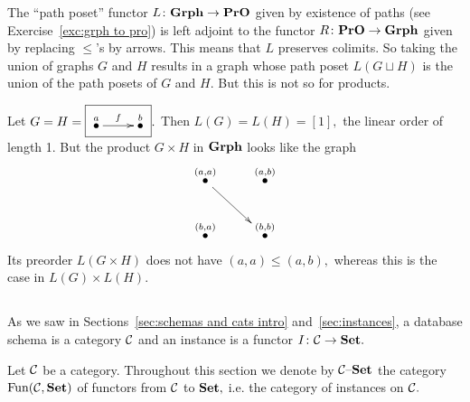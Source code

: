 \documentclass[../main/CT4S-EN-RU]{subfiles}
\begin{document}
\begin{exampleRUS}
\end{exampleRUS}

\begin{exampleENG}
The “path poset” functor $L\colon{\mathbf{Grph}}\rightarrow{\mathbf{PrO}}$ given by existence of paths (see Exercise~\ref{exc:grph to pro}) is left adjoint to the functor $R\colon{\mathbf{PrO}}\rightarrow{\mathbf{Grph}}$ given by replacing $\leq$'s by arrows. This means that $L$ preserves colimits. So taking the union of graphs $G$ and $H$ results in a graph whose path poset  $L(G\sqcup H)$ is the union of the path posets of $G$ and $H.$ But this is not so for products. 

Let $G=H=\fbox{\xymatrix{\LMO{a}\ar[r]^f&\LMO{b}}}.$ Then $L(G)=L(H)=[1],$ the linear order of length 1. But the product $G\times H$ in ${\mathbf{Grph}}$ looks like the graph 
$$\xymatrix{\LMO{(a,a)}\ar[rd]&\LMO{(a,b)}\\\LMO{(b,a)}&\LMO{(b,b)}}$$
Its preorder $L(G\times H)$ does not have $(a,a)\leq(a,b),$ whereas this is the case in $L(G)\times L(H).$
\end{exampleENG}

\begin{exampleRUS}
\end{exampleRUS}


\subsection{}\label{sec:data migration}

\begin{blockENG}
As we saw in Sections~\ref{sec:schemas and cats intro} and~\ref{sec:instances}, a database schema is a category $\mathcal{C}$ and an instance is a functor $I\colon\mathcal{C}\rightarrow{\mathbf{Set}}.$  
\end{blockENG}

\begin{blockRUS}
\end{blockRUS}

\begin{notationENG}
Let $\mathcal{C}$ be a category. Throughout this section we denote by $\mathcal{C}{\text \textendash}{\mathbf{Set}}$ the category $\operatorname{Fun}(\mathcal{C},{\mathbf{Set}})$ of functors from $\mathcal{C}$ to ${\mathbf{Set}},$ i.e. the category of instances on $\mathcal{C}.$ 
\end{notationENG}

\begin{notationRUS}
\end{notationRUS}
\end{document}
